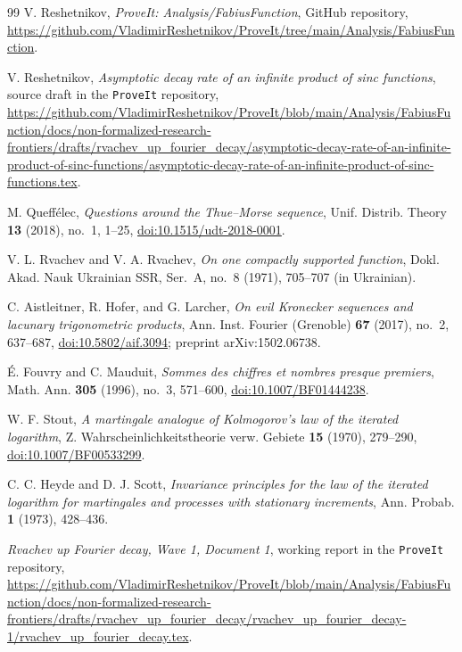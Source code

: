 \documentclass[11pt,oneside]{article}
\theoremstyle{definition}
\theoremstyle{remark}
\begin{document}
\begin{thebibliography}{99}
V. Reshetnikov,
\emph{ProveIt: Analysis/FabiusFunction}, GitHub repository,
\url{https://github.com/VladimirReshetnikov/ProveIt/tree/main/Analysis/FabiusFunction}.

V. Reshetnikov,
\emph{Asymptotic decay rate of an infinite product of sinc functions}, source draft in the
\texttt{ProveIt} repository,
\url{https://github.com/VladimirReshetnikov/ProveIt/blob/main/Analysis/FabiusFunction/docs/non-formalized-research-frontiers/drafts/rvachev_up_fourier_decay/asymptotic-decay-rate-of-an-infinite-product-of-sinc-functions/asymptotic-decay-rate-of-an-infinite-product-of-sinc-functions.tex}.

M. Queff\'elec,
\emph{Questions around the Thue--Morse sequence},
Unif. Distrib. Theory \textbf{13} (2018), no.~1, 1--25,
\href{https://doi.org/10.1515/udt-2018-0001}{doi:10.1515/udt-2018-0001}.

V. L. Rvachev and V. A. Rvachev,
\emph{On one compactly supported function},
Dokl. Akad. Nauk Ukrainian SSR, Ser.~A, no.~8 (1971), 705--707
(in Ukrainian).


C. Aistleitner, R. Hofer, and G. Larcher,
\emph{On evil Kronecker sequences and lacunary trigonometric products},
Ann. Inst. Fourier (Grenoble) \textbf{67} (2017), no.~2, 637--687,
\href{https://doi.org/10.5802/aif.3094}{doi:10.5802/aif.3094};
preprint arXiv:1502.06738.

\'E. Fouvry and C. Mauduit,
\emph{Sommes des chiffres et nombres presque premiers},
Math. Ann. \textbf{305} (1996), no.~3, 571--600,
\href{https://doi.org/10.1007/BF01444238}{doi:10.1007/BF01444238}.

W. F. Stout,
\emph{A martingale analogue of Kolmogorov's law of the iterated logarithm},
Z. Wahrscheinlichkeitstheorie verw. Gebiete \textbf{15} (1970), 279--290,
\href{https://doi.org/10.1007/BF00533299}{doi:10.1007/BF00533299}.

C. C. Heyde and D. J. Scott,
\emph{Invariance principles for the law of the iterated logarithm for martingales and
processes with stationary increments},
Ann. Probab. \textbf{1} (1973), 428--436.

\emph{Rvachev up Fourier decay, Wave 1, Document 1}, working report in the
\texttt{ProveIt} repository,
\url{https://github.com/VladimirReshetnikov/ProveIt/blob/main/Analysis/FabiusFunction/docs/non-formalized-research-frontiers/drafts/rvachev_up_fourier_decay/rvachev_up_fourier_decay-1/rvachev_up_fourier_decay.tex}.


\end{thebibliography}
\end{document}
